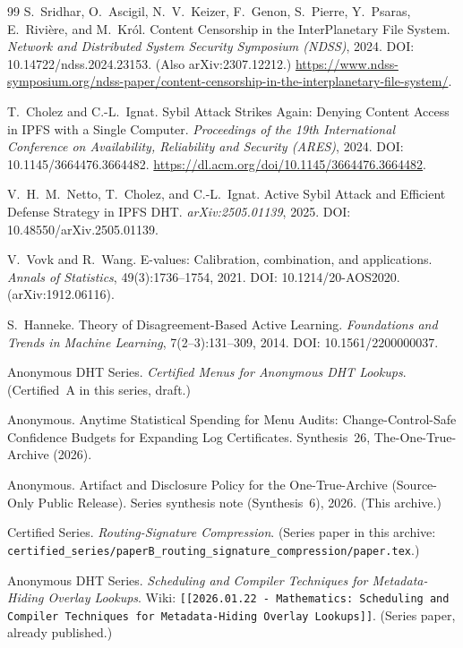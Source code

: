 \documentclass[11pt]{article}
\begin{document}
\begin{thebibliography}{99}
S.~Sridhar, O.~Ascigil, N.~V.~Keizer, F.~Genon, S.~Pierre, Y.~Psaras, E.~Rivi\`ere, and M.~Kr\'ol.
Content Censorship in the InterPlanetary File System.
\emph{Network and Distributed System Security Symposium (NDSS)}, 2024.
DOI: 10.14722/ndss.2024.23153. (Also arXiv:2307.12212.)
\url{https://www.ndss-symposium.org/ndss-paper/content-censorship-in-the-interplanetary-file-system/}.

T.~Cholez and C.-L.~Ignat.
Sybil Attack Strikes Again: Denying Content Access in IPFS with a Single Computer.
\emph{Proceedings of the 19th International Conference on Availability, Reliability and Security (ARES)}, 2024.
DOI: 10.1145/3664476.3664482.
\url{https://dl.acm.org/doi/10.1145/3664476.3664482}.

V.~H.~M.~Netto, T.~Cholez, and C.-L.~Ignat.
Active Sybil Attack and Efficient Defense Strategy in IPFS DHT.
\emph{arXiv:2505.01139}, 2025. DOI: 10.48550/arXiv.2505.01139.

V.~Vovk and R.~Wang.
E-values: Calibration, combination, and applications.
\emph{Annals of Statistics}, 49(3):1736--1754, 2021. DOI: 10.1214/20-AOS2020. (arXiv:1912.06116).

S.~Hanneke.
Theory of Disagreement-Based Active Learning.
\emph{Foundations and Trends in Machine Learning}, 7(2--3):131--309, 2014. DOI: 10.1561/2200000037.

Anonymous DHT Series.
\emph{Certified Menus for Anonymous DHT Lookups}.
(Certified~A in this series, draft.)

Anonymous.
\newblock Anytime Statistical Spending for Menu Audits: Change-Control-Safe Confidence Budgets for Expanding Log Certificates.
\newblock Synthesis~26, The-One-True-Archive (2026).



Anonymous.
\newblock Artifact and Disclosure Policy for the One-True-Archive (Source-Only Public Release).
\newblock Series synthesis note (Synthesis~6), 2026. (This archive.)

Certified Series.
\emph{Routing-Signature Compression}.
(Series paper in this archive: \texttt{certified\_series/paperB\_routing\_signature\_compression/paper.tex}.)

Anonymous DHT Series.
\emph{Scheduling and Compiler Techniques for Metadata-Hiding Overlay Lookups}.
Wiki: \texttt{[[2026.01.22 - Mathematics: Scheduling and Compiler Techniques for Metadata-Hiding Overlay Lookups]]}.
(Series paper, already published.)


\end{thebibliography}
\end{document}
